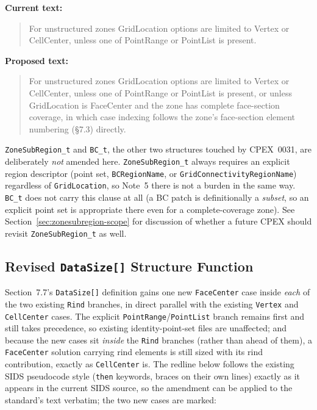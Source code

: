\documentclass[11pt,letterpaper]{article}
\newenvironment{sidsold}{%
  \par\vspace{0.6em}\noindent
  \begin{quote}\color{black!55}\ttfamily\small\itshape
}{%
  \end{quote}\vspace{-0.2em}
}
\newenvironment{sidsnew}{%
  \par\noindent
  \begin{quote}\color{cgnsblue!85}\ttfamily\small\bfseries
}{%
  \end{quote}\vspace{0.6em}
}
\begin{document}
\textbf{Current text:}
\begin{sidsold}
For unstructured zones GridLocation options are limited to Vertex or
CellCenter, unless one of PointRange or PointList is present.
\end{sidsold}

\textbf{Proposed text:}
\begin{sidsnew}
For unstructured zones GridLocation options are limited to Vertex or
CellCenter, unless one of PointRange or PointList is present,
{\color{cgnsgold}or unless GridLocation is FaceCenter and the zone has
complete face-section coverage, in which case indexing follows the
zone's face-section element numbering (\S7.3) directly.}
\end{sidsnew}

\texttt{ZoneSubRegion\_t} and \texttt{BC\_t}, the other two structures
touched by CPEX~0031, are deliberately \emph{not} amended here.
\texttt{ZoneSubRegion\_t} always requires an explicit region descriptor
(point set, \texttt{BCRegionName}, or \texttt{GridConnectivityRegionName})
regardless of \texttt{GridLocation}, so Note~5 there is not a burden in
the same way. \texttt{BC\_t} does not carry this clause at all (a BC
patch is definitionally a \emph{subset}, so an explicit point set is
appropriate there even for a complete-coverage zone). See
Section~\ref{sec:zonesubregion-scope} for discussion of whether a future
CPEX should revisit \texttt{ZoneSubRegion\_t} as well.

\subsection{Revised \texttt{DataSize[]} Structure Function}
\label{sec:datasize}

Section~7.7's \texttt{DataSize[]} definition gains one new
\texttt{FaceCenter} case inside \emph{each} of the two existing
\texttt{Rind} branches, in direct parallel with the existing
\texttt{Vertex} and \texttt{CellCenter} cases. The explicit
\texttt{PointRange}/\texttt{PointList} branch remains first and still
takes precedence, so existing identity-point-set files are unaffected;
and because the new cases sit \emph{inside} the \texttt{Rind} branches
(rather than ahead of them), a \texttt{FaceCenter} solution carrying rind
elements is still sized with its rind contribution, exactly as
\texttt{CellCenter} is. The redline below follows the existing SIDS
pseudocode style (\texttt{then} keywords, braces on their own lines)
exactly as it appears in the current SIDS source, so the amendment can be
applied to the standard's text verbatim; the two new cases are marked:
\end{document}
